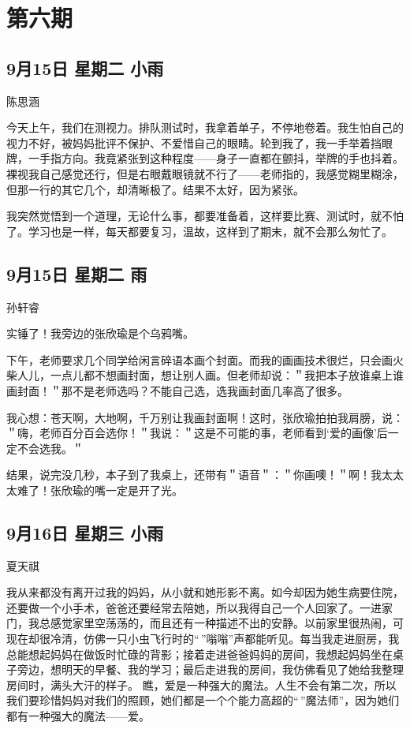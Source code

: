\chapter{第六期}

\section{9月15日 星期二 小雨}

陈思涵

今天上午，我们在测视力。排队测试时，我拿着单子，不停地卷着。我生怕自己的视力不好，被妈妈批评不保护、不爱惜自己的眼睛。轮到我了，我一手举着挡眼牌，一手指方向。我竟紧张到这种程度------身子一直都在颤抖，举牌的手也抖着。裸视我自己感觉还行，但是右眼戴眼镜就不行了------老师指的，我感觉糊里糊涂，但那一行的其它几个，却清晰极了。结果不太好，因为紧张。

我突然觉悟到一个道理，无论什么事，都要准备着，这样要比赛、测试时，就不怕了。学习也是一样，每天都要复习，温故，这样到了期末，就不会那么匆忙了。

\section{9月15日 星期二 雨}

孙轩睿

实锤了！我旁边的张欣瑜是个乌鸦嘴。

下午，老师要求几个同学给闲言碎语本画个封面。而我的画画技术很烂，只会画火柴人儿，一点儿都不想画封面，想让别人画。但老师却说：＂我把本子放谁桌上谁画封面！＂那不是老师选吗？不能自己选，选我画封面几率高了很多。

我心想：苍天啊，大地啊，千万别让我画封面啊！这时，张欣瑜拍拍我肩膀，说：＂嗨，老师百分百会选你！＂我说：＂这是不可能的事，老师看到`爱的画像'后一定不会选我。＂

结果，说完没几秒，本子到了我桌上，还带有＂语音＂：＂你画噢！＂啊！我太太太难了！张欣瑜的嘴一定是开了光。

\section{9月16日 星期三 小雨}

夏天祺

我从来都没有离开过我的妈妈，从小就和她形影不离。如今却因为她生病要住院，还要做一个小手术，爸爸还要经常去陪她，所以我得自己一个人回家了。一进家门，我总感觉家里空荡荡的，而且还有一种描述不出的安静。以前家里很热闹，可现在却很冷清，仿佛一只小虫飞行时的``\,''嗡嗡''声都能听见。每当我走进厨房，我总能想起妈妈在做饭时忙碌的背影；接着走进爸爸妈妈的房间，我想起妈妈坐在桌子旁边，想明天的早餐、我的学习；最后走进我的房间，我仿佛看见了她给我整理房间时，满头大汗的样子。
瞧，爱是一种强大的魔法。人生不会有第二次，所以我们要珍惜妈妈对我们的照顾，她们都是一个个能力高超的``\,''魔法师''，因为她们都有一种强大的魔法------爱。

